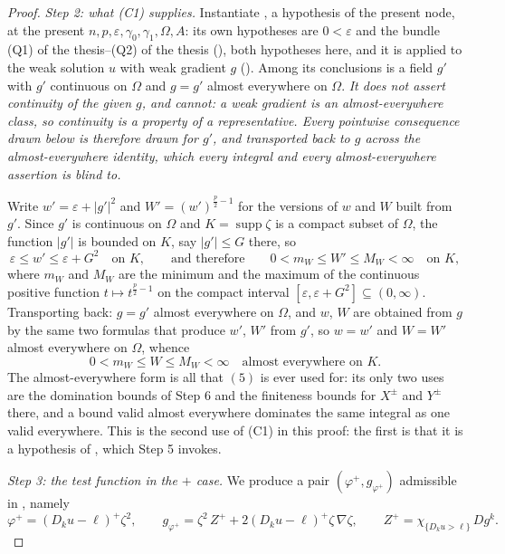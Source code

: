 \begin{proof}
\emph{Step 2: what (C1) supplies.}  Instantiate
, a hypothesis of the present node, at the
present $n,p,\varepsilon,\gamma_0,\gamma_1,\Omega,A$: its own hypotheses are
$0<\varepsilon$ and the bundle (Q1) of the thesis--(Q2) of the thesis
(), both hypotheses here, and it is applied to the
weak solution $u$ with weak gradient $g$ ().  Among
its conclusions is a field $g'$ with $g'$ continuous on $\Omega$ and $g=g'$
almost everywhere on $\Omega$.  \emph{It does not assert continuity of the given
$g$, and cannot: a weak gradient is an almost-everywhere class, so continuity is
a property of a representative.  Every pointwise consequence drawn below is
therefore drawn for $g'$, and transported back to $g$ across the
almost-everywhere identity, which every integral and every almost-everywhere
assertion is blind to.}

Write $w'=\varepsilon+|g'|^2$ and $W'=(w')^{\frac p2-1}$ for the versions of $w$
and $W$ built from $g'$.  Since $g'$ is continuous on $\Omega$ and
$K=\operatorname{supp}\zeta$ is a compact subset of $\Omega$, the function
$|g'|$ is bounded on $K$, say $|g'|\le G$ there, so
\[
\varepsilon\le w'\le\varepsilon+G^2\quad\text{on }K,
\qquad\text{and therefore}\qquad
0<m_W\le W'\le M_W<\infty\quad\text{on }K,
\]
where $m_W$ and $M_W$ are the minimum and the maximum of the continuous
positive function $t\mapsto t^{\frac p2-1}$ on the compact interval
$[\varepsilon,\varepsilon+G^2]\subseteq(0,\infty)$.  Transporting back: $g=g'$
almost everywhere on $\Omega$, and $w$, $W$ are obtained from $g$ by the same
two formulas that produce $w'$, $W'$ from $g'$, so $w=w'$ and $W=W'$ almost
everywhere on $\Omega$, whence
\[
0<m_W\le W\le M_W<\infty\quad\text{almost everywhere on }K.
\tag{5}
\]
The almost-everywhere form is all that $(5)$ is ever used for: its only two uses
are the domination bounds of Step 6 and the finiteness bounds for $X^{\pm}$ and
$Y^{\pm}$ there, and a bound valid almost everywhere dominates the same
integral as one valid everywhere.  This is the second use of
(C1) in this proof: the first is that it is a hypothesis of
, which Step 5 invokes.

\emph{Step 3: the test function in the $+$ case.}  We produce a pair
$(\varphi^{+},g_{\varphi^{+}})$ admissible in
, namely
\[
\varphi^{+}=(D_ku-\ell)^{+}\zeta^2,
\qquad
g_{\varphi^{+}}=\zeta^2\,Z^{+}+2(D_ku-\ell)^{+}\zeta\,\nabla\zeta ,
\qquad
Z^{+}=\chi_{\{D_ku>\ell\}}\,Dg^k .
\]


\end{proof}
